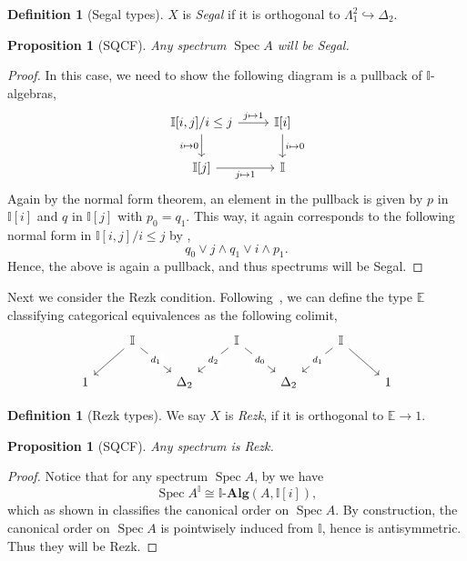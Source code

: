 \documentclass[12pt]{amsart}
\newtheorem{proposition}[theorem]{Proposition}
\theoremstyle{definition}
\newtheorem{definition}[theorem]{Definition}
\newcommand{\mb}[1]{\mathbf{#1}}
\newcommand{\mbb}[1]{\mathbb{#1}}
\newcommand{\I}{\mbb I}
\newcommand{\alg}{\text{-}\mb{Alg}}
\newcommand{\hook}{\hookrightarrow}
\newcommand{\spec}{\operatorname{Spec}}
\begin{document}
\begin{definition}[Segal types]
  $X$ is \emph{Segal} if it is orthogonal to $\Lambda^2_1 \hook \Delta_2$.
\end{definition}

\begin{proposition}[SQCF]
  Any spectrum $\spec A$ will be Segal.
\end{proposition}
\begin{proof}
  In this case, we need to show the following diagram is a pullback of $\I$-algebras, 
  \[
  \begin{tikzcd}
    \I[i,j]/i\le j \ar[r, "j \mapsto 1"] \ar[d, "i \mapsto 0"'] & \I[i] \ar[d, "i \mapsto 0"] \\
    \I[j] \ar[r, "j \mapsto 1"'] & \I
  \end{tikzcd}
  \]
  Again by the normal form theorem, an element in the pullback is given by $p$ in $\I[i]$ and $q$ in $\I[j]$ with $p_0 = q_1$. This way, it again corresponds to the following normal form in $\I[i,j]/i \le j$ by ,
  \[ q_0 \vee j \wedge q_1 \vee i \wedge p_1. \]
  Hence, the above is again a pullback, and thus spectrums will be Segal.
\end{proof}

Next we consider the Rezk condition. Following~\cite{buchholtz2021synthetic}, we can define the type $\mbb E$ classifying categorical equivalences as the following colimit,
\[
\begin{tikzcd}
	& \I && \I && \I \\
	1 && {\Delta_2} && {\Delta_2} && 1
	\arrow[from=1-2, to=2-1]
	\arrow["{d_1}"{description}, from=1-2, to=2-3]
	\arrow["{d_2}"{description}, from=1-4, to=2-3]
	\arrow["{d_0}"{description}, from=1-4, to=2-5]
	\arrow["{d_1}"{description}, from=1-6, to=2-5]
	\arrow[from=1-6, to=2-7]
\end{tikzcd}
\]

\begin{definition}[Rezk types]
  We say $X$ is \emph{Rezk}, if it is orthogonal to $\mbb E \to 1$.
\end{definition}

\begin{proposition}[SQCF]
  Any spectrum is Rezk.
\end{proposition}
\begin{proof}
  Notice that for any spectrum $\spec A$, by  we have
  \[ \spec A^\I \cong \I\alg(A,\I[i]), \]
  which as shown in  classifies the canonical order on $\spec A$. By construction, the canonical order on $\spec A$ is pointwisely induced from $\I$, hence is antisymmetric. Thus they will be Rezk.
\end{proof}
\end{document}

